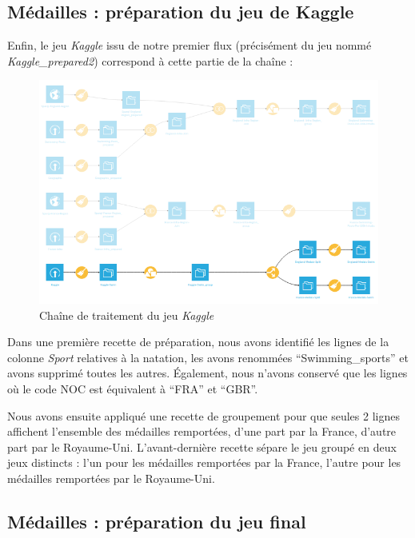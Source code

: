 \documentclass[hidelinks, 12pt]{report}
\begin{document}
%





\subsection{Médailles : préparation du jeu de Kaggle}

Enfin, le jeu \textit{Kaggle} issu de notre premier flux (précisément du jeu nommé \textit{Kaggle\_prepared2}) correspond à cette partie de la chaîne :

\begin{center}
	\begin{figure}[H]
		\setlength{\belowcaptionskip}{-35pt}
		\includegraphics[scale=0.55]{images/flow-swim-kaggle.png}
		\caption{Chaîne de traitement du jeu \textit{Kaggle}}
	\end{figure}
\end{center}

Dans une première recette de préparation, nous avons identifié les lignes de la colonne \textit{Sport} relatives à la natation, les avons renommées \enquote{Swimming\_sports} et avons supprimé toutes les autres. Également, nous n'avons conservé que les lignes où le code NOC est équivalent à \enquote{FRA} et \enquote{GBR}.

Nous avons ensuite appliqué une recette de groupement pour que seules 2 lignes affichent l'ensemble des médailles remportées, d'une part par la France, d'autre part par le Royaume-Uni. L'avant-dernière recette sépare le jeu groupé en deux jeux distincts : l'un pour les médailles remportées par la France, l'autre pour les médailles remportées par le Royaume-Uni.

\subsection{Médailles : préparation du jeu final}
\end{document}
